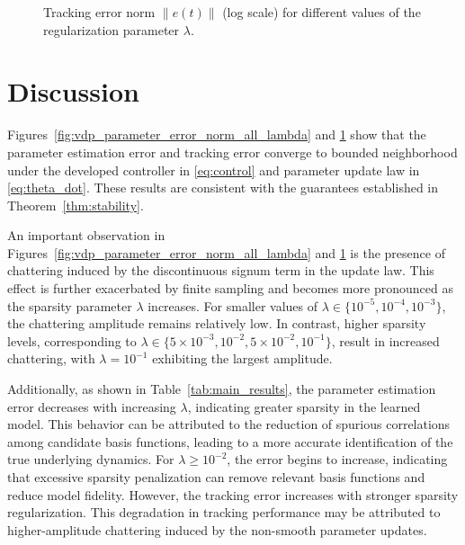 \documentclass[conference]{ieeeconf}
\begin{document}
\begin{figure}[t]
\caption{Tracking error norm $\|e(t)\|$ (log scale) for different values of the regularization parameter $\lambda$.}
\label{fig:vdp_tracking_error_norm_all_lambda}
\end{figure}

\section{Discussion}
Figures~\ref{fig:vdp_parameter_error_norm_all_lambda} and \ref{fig:vdp_tracking_error_norm_all_lambda} show that the parameter estimation error and tracking error converge to bounded neighborhood under the developed controller in \eqref{eq:control} and parameter update law in \eqref{eq:theta_dot}. These results are consistent with the guarantees established in Theorem~\ref{thm:stability}.

An important observation in Figures~\ref{fig:vdp_parameter_error_norm_all_lambda} and \ref{fig:vdp_tracking_error_norm_all_lambda} is the presence of chattering induced by the discontinuous signum term in the update law. This effect is further exacerbated by finite sampling and becomes more pronounced as the sparsity parameter $\lambda$ increases. For smaller values of $\lambda \in \{10^{-5}, 10^{-4}, 10^{-3}\}$, the chattering  amplitude remains relatively low. In contrast, higher sparsity levels, corresponding to $\lambda \in \{5\times10^{-3}, 10^{-2},5\times10^{-2}, 10^{-1}\}$, result in increased chattering, with $\lambda = 10^{-1}$ exhibiting the largest amplitude.

Additionally, as shown in Table~\ref{tab:main_results}, the parameter estimation error decreases with increasing $\lambda$, indicating greater sparsity in the learned model. This behavior can be attributed to the reduction of spurious correlations among candidate basis functions, leading to a more accurate identification of the true underlying dynamics. For $\lambda \geq 10^{-2}$, the error begins to increase, indicating that excessive sparsity penalization can remove relevant basis functions and reduce model fidelity. However, the tracking error increases with stronger sparsity regularization. This degradation in tracking performance may be attributed to higher-amplitude chattering induced by the non-smooth parameter updates.
\end{document}
